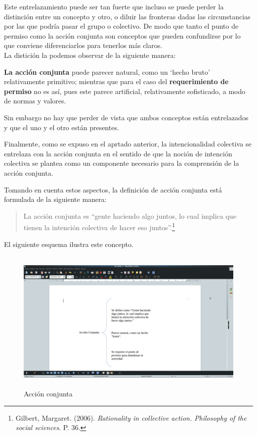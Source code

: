 \documentclass[oneside]{book}
\begin{document}
Este entrelazamiento puede ser tan fuerte que incluso se puede perder la distinción entre un concepto y otro, o diluir las fronteras dadas las circunstancias por las que podría pasar el grupo o colectivo. De modo que tanto el punto de permiso como la acción conjunta son conceptos que pueden confundirse por lo que conviene diferenciarlos para tenerlos más claros.
\\

La distición la podemos observar de la siguiente manera: 

\textbf{La acción conjunta} puede parecer natural, como un ‘hecho bruto’ relativamente primitivo; mientras que para el caso del \textbf{requerimiento de permiso} no es así, pues este parece artificial, relativamente sofisticado, a modo de normas y valores.

Sin embargo no hay que perder de vista que ambos conceptos están entrelazados y que el uno y el otro están presentes. 

Finalmente, como se expuso en el aprtado anterior, la intencionalidad colectiva se entrelaza con la acción conjunta en el sentido de que la noción de intención colectiva se plantea como un componente necesario para la comprensión de la acción conjunta.

Tomando en cuenta estos aspectos, la definición de acción conjunta está formulada de la siguiente manera:
\begin{quote}
La acción conjunta es ``gente haciendo algo juntos, lo cual implica que tienen la intención colectiva de hacer eso juntos''.\footnote{Gilbert, Margaret. (2006). \textit{Rationality in collective action. Philosophy of the social sciences}. P. 36.}
\end{quote}

El siguiente esquema ilustra este concepto.


\begin{figure}[h]
	\centering
	\includegraphics[width=12cm, height=7cm]{img/esquema_4}
	\caption{Acción conjunta}

\end{figure}
\end{document}
